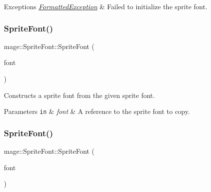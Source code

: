 \begin{DoxyExceptions}{Exceptions}
{\em \hyperlink{structmage_1_1_formatted_exception}{Formatted\+Exception}} & Failed to initialize the sprite font. \\
\hline
\end{DoxyExceptions}
\hypertarget{classmage_1_1_sprite_font_a5df751fe06abda25127fdd9222e41948}{}\label{classmage_1_1_sprite_font_a5df751fe06abda25127fdd9222e41948} 
\subsubsection{\texorpdfstring{Sprite\+Font()}{SpriteFont()}\hspace{0.1cm}{\footnotesize\ttfamily [2/3]}}
{\footnotesize\ttfamily mage\+::\+Sprite\+Font\+::\+Sprite\+Font (\begin{DoxyParamCaption}\item[{const \hyperlink{classmage_1_1_sprite_font}{Sprite\+Font} \&}]{font }\end{DoxyParamCaption})\hspace{0.3cm}{\ttfamily [delete]}}

Constructs a sprite font from the given sprite font.


\begin{DoxyParams}[1]{Parameters}
\mbox{\tt in}  & {\em font} & A reference to the sprite font to copy. \\
\hline
\end{DoxyParams}
\hypertarget{classmage_1_1_sprite_font_ad04b6470c6cf226703c0bb6ccb5dc31a}{}\label{classmage_1_1_sprite_font_ad04b6470c6cf226703c0bb6ccb5dc31a} 
\subsubsection{\texorpdfstring{Sprite\+Font()}{SpriteFont()}\hspace{0.1cm}{\footnotesize\ttfamily [3/3]}}
{\footnotesize\ttfamily mage\+::\+Sprite\+Font\+::\+Sprite\+Font (\begin{DoxyParamCaption}\item[{\hyperlink{classmage_1_1_sprite_font}{Sprite\+Font} \&\&}]{font }\end{DoxyParamCaption})\hspace{0.3cm}{\ttfamily [default]}}

